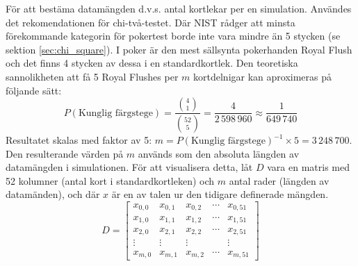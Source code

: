 \documentclass[swedish,a4paper]{article}
\begin{document}
För att bestäma datamängden d.v.s. antal kortlekar per en simulation. Användes
det rekomendationen för chi-två-testet. Där NIST rådger att minsta förekommande
kategorin för pokertest borde inte vara mindre än 5 stycken (se sektion
\ref{sec:chi_square}). 
I poker är den mest
sällsynta pokerhanden Royal Flush och det finns 4
stycken av dessa i en standardkortlek. Den teoretiska sannolikheten att
få 5 Royal Flushes per $m$ kortdelnigar kan aproximeras på följande sätt: 
$$ P(\text{Kunglig färgstege}) =  \frac{\binom{4}{1}}{\binom{52}{5}} =
\frac{4}{2\,598\,960} \approx \frac{1}{649\,740} $$ 
Resultatet skalas med faktor av 5:
$m = P(\text{Kunglig färgstege})^{-1}  \times 5 = 3\,248\,700$.
Den resulterande värden på $m$ används som den absoluta längden av datamängden i
simulationen. För att visualisera detta, låt $D$ vara en \gls{matris} 
med 52 kolumner (antal kort i standardkortleken) och $m$ antal rader (längden av
datamänden), och där $x$ är en av talen ur den tidigare definerade mängden.
\begin{equation*}
	D = \begin{bmatrix}
		x_{0,0} & x_{0,1} & x_{0,2} & \cdots & x_{0,51}\\ 
		x_{1,0} & x_{1,1} & x_{1,2} & \cdots & x_{1,51}\\
		x_{2,0} & x_{2,1} & x_{2,2} & \cdots & x_{2,51}\\
		\vdots & \vdots & \vdots & \; & \vdots \\
		x_{m,0} & x_{m,1} & x_{m,2} & \cdots & x_{m,51}
	\end{bmatrix}
\end{equation*}
\end{document}
